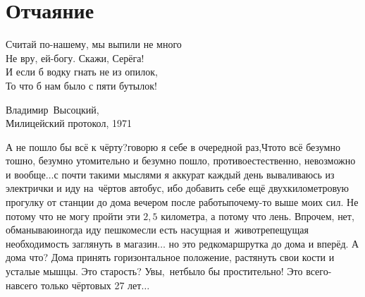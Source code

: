 \chapter{Отчаяние} 
\vepsianrose

\setlength{\epigraphwidth}{0.7\textwidth}

\epigraph{%
	Считай по-нашему, мы выпили не много\mdash\\
	Не вру, ей-богу. Скажи, Серёга!\\
	И если б водку гнать не из опилок,\\
	То что б нам было с пяти бутылок!}
	{
	\begin{flushright}
		\small{Владимир~Высоцкий,\\Милицейский протокол, 1971}
	\end{flushright}
	}


\diagdash А не пошло бы всё к чёрту?\mdash говорю я себе в очередной раз,\mdash Что\sdash то всё безумно тошно, безумно утомительно и безумно пошло, противоестественно, невозможно и вообще$\ldots$\mdash с почти такими мыслями я аккурат каждый день вываливаюсь из электрички и иду на~чёртов автобус, ибо добавить себе ещё двухкилометровую прогулку от станции до дома вечером после работы\mdash почему-то выше моих сил.
Не потому что не могу пройти эти ${2,5}$ километра, а потому что лень. Впрочем, нет, обманываю\mdash иногда иду пешком\mdash если есть насущная и~животрепещущая необходимость заглянуть в магазин$\ldots$ но это редко\mdash маршрутка до дома и вперёд. %
А дома что? Дома принять горизонтальное положение, растянуть свои кости и усталые мышцы. Это старость? Увы,~нет\mdash было бы простительно! Это всего-навсего только чёртовых 27 лет$\ldots$

